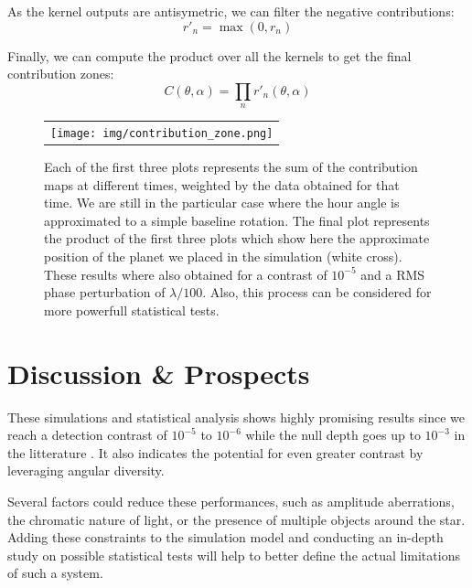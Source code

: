 \documentclass[]{spie}  %
\begin{document}
As the kernel outputs are antisymetric, we can filter the negative contributions:
\begin{equation}
    \label{eq:heaviside}
    r'_n = \max(0, r_n)
\end{equation}


Finally, we can compute the product over all the kernels to get the final contribution zones:
\begin{equation}
    \label{eq:final}
    C(\theta, \alpha) = \prod_n r'_n(\theta, \alpha)
\end{equation}

\begin{figure}[H]
    \begin{center}
    \begin{tabular}{c}
    \texttt{[image: img/contribution\_zone.png]}
    \end{tabular}
    \end{center}
    \caption[contribution_zone] 
    {\label{fig:contribution_zone} 
    Each of the first three plots represents the sum of the contribution maps at different times, weighted by the data obtained for that time. We are still in the particular case where the hour angle is approximated to a simple baseline rotation. The final plot represents the product of the first three plots which show here the approximate position of the planet we placed in the simulation (white cross). These results where also obtained for a contrast of $10^{-5}$ and a RMS phase perturbation of $\lambda / 100$. Also, this process can be considered for more powerfull statistical tests.}
\end{figure}

\section{Discussion \& Prospects}

These simulations and statistical analysis shows highly promising results since we reach a detection contrast of $10^{-5}$ to $10^{-6}$ while the null depth goes up to $10^{-3}$ in the litterature \cite{Cvetojevic et al. 2022}. It also indicates the potential for even greater contrast by leveraging angular diversity.

Several factors could reduce these performances, such as amplitude aberrations, the chromatic nature of light, or the presence of multiple objects around the star. Adding these constraints to the simulation model and conducting an in-depth study on possible statistical tests will help to better define the actual limitations of such a system.
\end{document}
